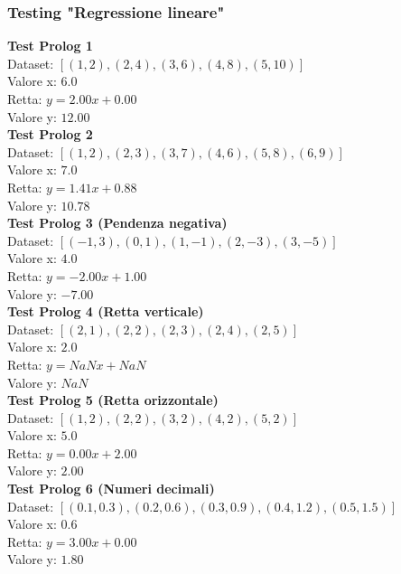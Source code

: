 \documentclass[11pt]{article}
\theoremstyle{definition}
\begin{document}
\subsubsection{Testing "Regressione lineare"}
\noindent
\textbf{Test Prolog 1}\\
Dataset: $[(1, 2), (2, 4), (3, 6), (4, 8), (5, 10)]$\\
Valore x: $6.0$\\
Retta: $y = 2.00x + 0.00$\\
Valore y: $12.00$\\
\newline
\textbf{Test Prolog 2}\\
Dataset: $[(1, 2), (2, 3), (3, 7), (4, 6), (5, 8), (6, 9)]$\\
Valore x: $7.0$\\
Retta: $y = 1.41x + 0.88$\\
Valore y: $10.78$\\
\newline
\textbf{Test Prolog 3 (Pendenza negativa)}\\
Dataset: $[(-1, 3), (0, 1), (1, -1), (2, -3), (3, -5)]$\\
Valore x: $4.0$\\
Retta: $y = -2.00x + 1.00$\\
Valore y: $-7.00$\\
\newline
\textbf{Test Prolog 4 (Retta verticale)}\\
Dataset: $[(2, 1), (2, 2), (2, 3), (2, 4), (2, 5)]$\\
Valore x: $2.0$\\
Retta: $y = NaNx + NaN$\\
Valore y: $NaN$\\
\newline
\textbf{Test Prolog 5 (Retta orizzontale)}\\
Dataset: $[(1, 2), (2, 2), (3, 2), (4, 2), (5, 2)]$\\
Valore x: $5.0$\\
Retta: $y = 0.00x + 2.00$\\
Valore y: $2.00$\\
\newline
\textbf{Test Prolog 6 (Numeri decimali)}\\
Dataset: $[(0.1, 0.3), (0.2, 0.6), (0.3, 0.9), (0.4, 1.2), (0.5, 1.5)]$\\
Valore x: $0.6$\\
Retta: $y = 3.00x + 0.00$\\
Valore y: $1.80$
\end{document}
